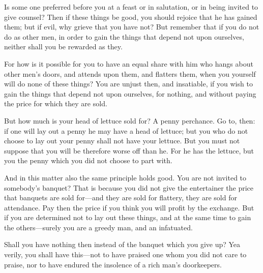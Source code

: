Is some  one preferred  before you  at a feast  or in  salutation, or  in being
invited to give counsel? Then if these  things be good, you should rejoice that
he has  gained them; but if  evil, why grieve  that you have not?  But remember
that if you do not do as other men, in order to gain the things that depend not
upon ourselves, neither shall you be rewarded as they.

For how is it possible for you to  have an equal share with him who hangs about
other men's doors, and attends upon  them, and flatters them, when you yourself
will do none of these things? You  are unjust then, and insatiable, if you wish
to gain  the things that  depend not upon  ourselves, for nothing,  and without
paying the price for which they are sold.

But how much is your head of lettuce  sold for? A penny perchance. Go to, then:
if one will lay out  a penny he may have a head of lettuce;  but you who do not
choose to  lay out your  penny shall  not have your  lettuce. But you  must not
suppose that you will  be therefore worse off than he. For  he has the lettuce,
but you the penny which you did not choose to part with.

And in this matter  also the same principle holds good. You  are not invited to
somebody's banquet? That is because you  did not give the entertainer the price
that banquets are sold for---and they are  sold for flattery, they are sold for
attendance. Pay then  the price if you  think you will profit  by the exchange.
But if you are determined not to lay  out these things, and at the same time to
gain the others---surely you are a greedy man, and an infatuated.

Shall you  have nothing  then instead  of the  banquet which  you give  up? Yea
verily, you shall have this---not to have  praised one whom you did not care to
praise, nor to have endured the insolence of a rich man's doorkeepers.
